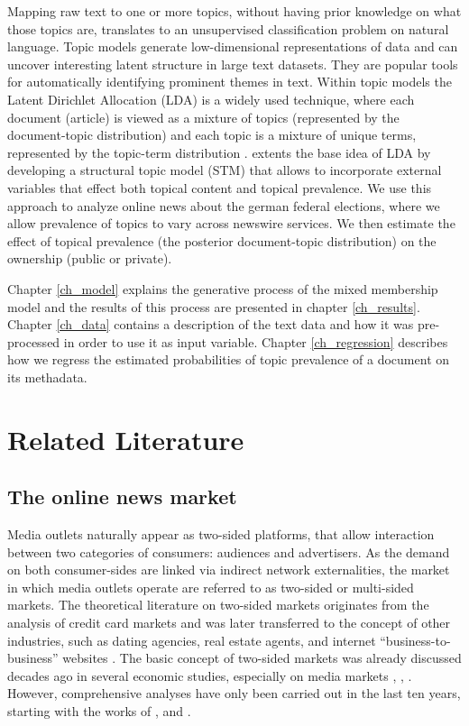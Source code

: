 \documentclass[12pt,a4paper,notitlepage]{article}
\begin{document}
Mapping raw text to one or more topics, without having prior knowledge on what those topics are, translates to an unsupervised classification problem on natural language. Topic models generate low-dimensional representations of data and can uncover interesting latent structure in large text datasets. They are popular tools for automatically identifying prominent themes in text. Within topic models the Latent Dirichlet Allocation (LDA) is a widely used technique, where each document (article) is viewed as a mixture of topics (represented by the document-topic distribution) and each topic is a mixture of unique terms, represented by the topic-term distribution \citep{blei_latent_2003}. \citet{roberts_model_2016} extents the base idea of LDA by developing a structural topic model (STM) that allows to incorporate external variables that effect both topical content and topical prevalence. We use this approach to analyze online news about the german federal elections, where we allow prevalence of topics to vary across newswire services. We then estimate the effect of topical prevalence (the posterior document-topic distribution) on the ownership (public or private).

Chapter \ref{ch_model} explains the generative process of the mixed membership model and the results of this process are presented in chapter \ref{ch_results}. Chapter \ref{ch_data} contains a description of the text data and how it was pre-processed in order to use it as input variable. Chapter \ref{ch_regression} describes how we regress the estimated probabilities of topic prevalence of a document on its methadata.

\section{Related Literature}
\subsection{The online news market}

Media outlets naturally appear as two-sided platforms, that allow interaction between two categories of consumers: audiences and advertisers. As the demand on both consumer-sides are linked via indirect network externalities, the market in which media outlets operate are referred to as two-sided or multi-sided markets. The theoretical literature on two-sided markets originates from the analysis of credit card markets \citep{rochet_platform_2003} and was later transferred to the concept of other industries, such as dating agencies, real estate agents, and internet “business-to-business” websites \citep{caillaud_chicken_2003}. The basic concept of two-sided markets was already discussed decades ago in several economic studies, especially on media markets \citep{corden_maximisation_1952}, \citep{gustafsson_circulation_1978}, \citep{blair_pricing_1993}. However, comprehensive analyses have only been carried out in the last ten years, starting with the works of \citet{rochet_platform_2003}, \citet{evans_empirical_2003} and \citet{armstrong_competition_2006}.
\end{document}
